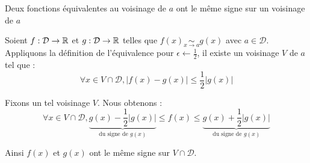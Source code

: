 \documentclass{article}
\renewenvironment{question_kholle}[2][ ]
{
	\subsection{\texorpdfstring{#2}{}}
	\notblank{#1}
	{
		\noindent #1
		\bigbreak
	}
	{}
	\begin{proof}
}
{
	\end{proof}
}
\begin{document}
	\begin{question_kholle}
		{Deux fonctions équivalentes au voisinage de $a$ ont le même signe sur un voisinage de $a$}
		
		Soient $f : \mathcal{D} \rightarrow \mathbb R$ et $g : \mathcal{D} \rightarrow \mathbb R$ telles que $f(x) \underset{x \rightarrow a}{\sim} g(x)$ avec $a \in \mathcal{D}$. \\
		Appliquons la définition de l'équivalence pour $\epsilon \leftarrow \frac{1}{2}$, il existe un voisinage $V$ de $a$ tel que :
		\begin{equation*}
			\forall x \in V \cap \mathcal{D},
			| f(x) - g(x) | \leqslant \frac{1}{2} | g(x) |
		\end{equation*}
	
		Fixons un tel voisinage $V$.
		Nous obtenons :
		\begin{equation*}
			\forall x \in V \cap \mathcal{D},
			\underbrace{g(x) - \frac{1}{2} | g(x) |}_{\text{du signe de }g(x)}
			\leqslant f(x) \leqslant
			\underbrace{g(x) + \frac{1}{2} | g(x) |}_{\text{du signe de }g(x)}
		\end{equation*}
	
		Ainsi $f(x)$ et $g(x)$ ont le même signe sur $V \cap \mathcal{D}$.
	\end{question_kholle}
\end{document}
